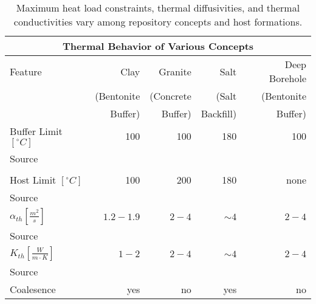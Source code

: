 %
\begin{table}[h!]
  \centering
  \footnotesize{
  \begin{tabular}{|l|r|r|r|r|}
    \multicolumn{5}{c}{\textbf{Thermal Behavior of Various Concepts}}\\
    \hline
    Feature & Clay & Granite & Salt & Deep Borehole \\ 
            & (Bentonite & (Concrete & (Salt & (Bentonite\\ 
            & Buffer) & Buffer) & Backfill) & Buffer) \\ 
    \hline
    Buffer Limit $[^{\circ}C]$ & 100  & 100  & 180 & 100  \\ 
    Source                     &      &      &     &      \\
    & \cite{<++>}   
    & \cite{<++>}   
    & \cite{<++>}   
    & \cite{<++>}   \\
    Host Limit $[^{\circ}C]$   & 100  & 200  & 180 & none \\ 
    Source                     
    & \cite{<++>}   
    & \cite{<++>}   
    & \cite{<++>}   
    & \cite{<++>}   \\
    $\alpha_{th} [\frac{m^2}{s}]$ & $1.2-1.9$ & $2-4$ & $\sim4$  & $2-4$ \\ 
    Source                     
    & \cite{tikhonravova_effect_2007} 
    & \cite{durham_thermal_1987,hardin_generic_2011,kim_thermal_2007}     
    & \cite{hardin_generic_2011,nieland_storage_2001}   
    & \cite{durham_thermal_1987,hardin_generic_2011,kim_thermal_2007}   \\ 
    $K_{th} [\frac{W}{m{\cdot}K}]$ & $1-2$ & $2-4$ & $\sim4$  & $2-4$ \\ 
    Source                     
    & \cite{hardin_generic_2011,tikhonravova_effect_2007}    
    & \cite{hardin_generic_2011,kim_thermal_2007,surma_porosity_2003,ab_long-term_2006}    
    & \cite{hardin_generic_2011,nieland_storage_2001}
    & \cite{hardin_generic_2011,kim_thermal_2007,surma_porosity_2003}\\ 
    Coalesence & yes & no & yes & no \\ 
    \hline
  \end{tabular}
  \caption[Models for Heat Transport for Various Geologies]{Maximum heat load constraints, thermal 
  diffusivities, and thermal conductivities vary among repository concepts and host formations. }
  }
  \label{tab:heat_tab}
\end{table}
